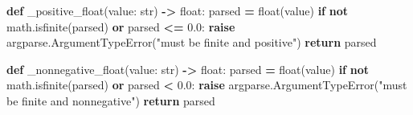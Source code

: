 \documentclass[
  chinese,
  11pt,
  letterpaper,
]{article}
\newenvironment{Shaded}{\begin{snugshade}}{\end{snugshade}}
\newcommand{\BuiltInTok}[1]{#1}
\newcommand{\ControlFlowTok}[1]{\textcolor[rgb]{0.13,0.29,0.53}{\textbf{#1}}}
\newcommand{\FloatTok}[1]{\textcolor[rgb]{0.00,0.00,0.81}{#1}}
\newcommand{\KeywordTok}[1]{\textcolor[rgb]{0.13,0.29,0.53}{\textbf{#1}}}
\newcommand{\NormalTok}[1]{#1}
\newcommand{\OperatorTok}[1]{\textcolor[rgb]{0.81,0.36,0.00}{\textbf{#1}}}
\newcommand{\StringTok}[1]{\textcolor[rgb]{0.31,0.60,0.02}{#1}}
\renewenvironment{Shaded}{\par\smallskip}{\par\smallskip}
\begin{document}
\begin{Shaded}
\begin{Highlighting}[]
\KeywordTok{def}\NormalTok{ \_positive\_float(value: }\BuiltInTok{str}\NormalTok{) }\OperatorTok{{-}\textgreater{}} \BuiltInTok{float}\NormalTok{:}
\NormalTok{    parsed }\OperatorTok{=} \BuiltInTok{float}\NormalTok{(value)}
    \ControlFlowTok{if} \KeywordTok{not}\NormalTok{ math.isfinite(parsed) }\KeywordTok{or}\NormalTok{ parsed }\OperatorTok{\textless{}=} \FloatTok{0.0}\NormalTok{:}
        \ControlFlowTok{raise}\NormalTok{ argparse.ArgumentTypeError(}\StringTok{"must be finite and positive"}\NormalTok{)}
    \ControlFlowTok{return}\NormalTok{ parsed}


\KeywordTok{def}\NormalTok{ \_nonnegative\_float(value: }\BuiltInTok{str}\NormalTok{) }\OperatorTok{{-}\textgreater{}} \BuiltInTok{float}\NormalTok{:}
\NormalTok{    parsed }\OperatorTok{=} \BuiltInTok{float}\NormalTok{(value)}
    \ControlFlowTok{if} \KeywordTok{not}\NormalTok{ math.isfinite(parsed) }\KeywordTok{or}\NormalTok{ parsed }\OperatorTok{\textless{}} \FloatTok{0.0}\NormalTok{:}
        \ControlFlowTok{raise}\NormalTok{ argparse.ArgumentTypeError(}\StringTok{"must be finite and nonnegative"}\NormalTok{)}
    \ControlFlowTok{return}\NormalTok{ parsed}



\end{Highlighting}
\end{Shaded}
\end{document}
